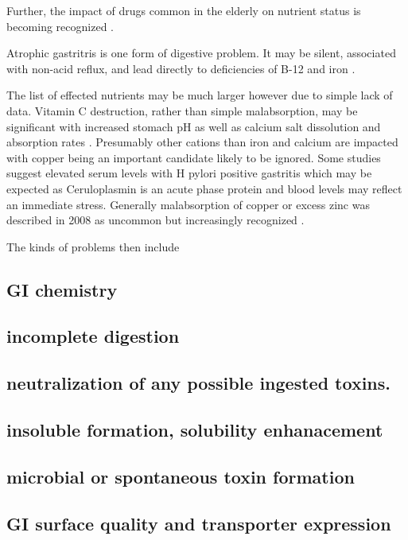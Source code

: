 Further, the impact of drugs common in the elderly on 
nutrient status is becoming recognized
\cite{Bell_Rodrigues_Antoniadou_Update_Drug_2023}.

Atrophic gastritris is one form of digestive problem.
It may be silent, associated with non-acid reflux, 
and lead directly to deficiencies of B-12 and iron
\cite{PMC6502219}.

The list of effected nutrients may be much larger however
due to simple lack of data. Vitamin C destruction,
rather than simple malabsorption, may be significant
with increased stomach pH as well as calcium salt dissolution
and absorption rates \cite{PMC5292330}.
Presumably other cations than iron and calcium are impacted
with copper being an important candidate likely to be ignored. 
Some studies suggest elevated serum levels
with H pylori positive gastritis 
\cite{Altaee_Determination_Levels_2025}
which may be expected as Ceruloplasmin is an acute phase
protein and blood levels may reflect an immediate stress.
Generally malabsorption of copper or excess zinc was described in 2008
as uncommon but increasingly recognized
\cite{CARMEL2008225}.

The kinds of problems then include


\subsection{  GI chemistry  } 

\subsection{ incomplete digestion  } 
\subsection{ neutralization of any possible ingested toxins. } 

\subsection{insoluble formation, solubility enhanacement   } 

\subsection{ microbial or spontaneous toxin formation  } 

\subsection{ GI surface quality and transporter expression  }

